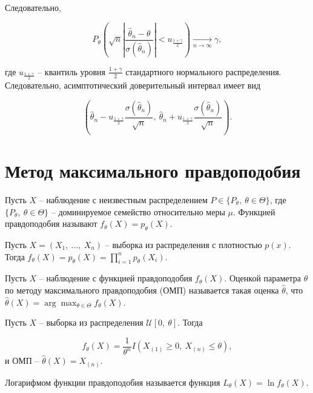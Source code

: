 Следовательно,


\begin{equation*}
    P_{\theta }\left(\sqrt{n}\left| \dfrac{\hat{\theta }_{n} -\theta }{\sigma (\hat{\theta }_{n})}\right| < u_{\frac{1+\gamma }{2}}\right)\xrightarrow[n\rightarrow \infty ]{} \gamma ,
\end{equation*}


где $\displaystyle u_{\frac{1+\gamma }{2}}$ -- квантиль уровня $\displaystyle \frac{1+\gamma }{2}$ стандартного нормального распределения. Следовательно, асимптотический доверительный интервал имеет вид


\begin{equation*}
    \left(\hat{\theta }_{n} -u_{\frac{1+\gamma }{2}}\dfrac{\sigma (\hat{\theta }_{n})}{\sqrt{n}} ,\ \hat{\theta }_{n} +u_{\frac{1+\gamma }{2}}\dfrac{\sigma (\hat{\theta }_{n})}{\sqrt{n}}\right) .
\end{equation*}

\section{Метод максимального правдоподобия}
\begin{definition}
    Пусть $\displaystyle X$ -- наблюдение с неизвестным распределением $\displaystyle P\in \{P_{\theta } ,\ \theta \in \Theta \}$, где $\displaystyle \{P_{\theta } ,\ \theta \in \Theta \}$ -- доминируемое семейство относительно меры $\displaystyle \mu $. Функцией правдоподобия называют $\displaystyle f_{\theta }( X) =p_{\theta }( X)$.
\end{definition}
\begin{example}
    Пусть $\displaystyle X=( X_{1} ,\ \dotsc ,\ X_{n})$ -- выборка из распределения с плотностью $\displaystyle p( x)$. Тогда $\displaystyle f_{\theta }( X) =p_{\theta }( X) =\prod _{i=1}^{n} p_{\theta }( X_{i})$.
\end{example}
\begin{definition}
    Пусть $\displaystyle X$ -- наблюдение с функцией правдоподобия $\displaystyle f_{\theta }( X)$. Оценкой параметра $\displaystyle \theta $ по методу максимального правдоподобия (ОМП) называется такая оценка $\displaystyle \hat{\theta }$, что $\displaystyle \hat{\theta }( X) =\arg\max_{\theta \in \Theta } f_{\theta }( X)$.
\end{definition}
\begin{example}
    Пусть $\displaystyle X$ -- выборка из распределения $\displaystyle \mathcal{U}[ 0,\ \theta ]$. Тогда
    
    
    \begin{equation*}
        f_{\theta }( X) =\dfrac{1}{\theta ^{n}} I( X_{( 1)} \geqslant 0,\ X_{( n)} \leqslant \theta ) ,
    \end{equation*}
    и ОМП -- $\displaystyle \hat{\theta }( X) =X_{( n)}$.
\end{example}
\begin{definition}
    Логарифмом функции правдоподобия называется функция $\displaystyle L_{\theta }( X) =\ln f_{\theta }( X)$.
\end{definition}
